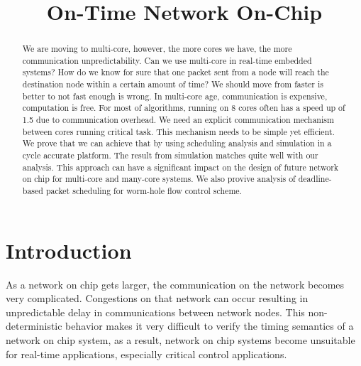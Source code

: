 \documentclass[conference, twocolumn]{IEEEtran}
\theoremstyle{definition}
\begin{document}
\title{On-Time Network On-Chip}


\maketitle

\begin{abstract}
We are moving to multi-core, however, the more cores we have, the more
communication unpredictability. Can we use multi-core in real-time embedded
systems? How do we know for sure that one packet sent from a node will reach
the destination node within a certain amount of time? We should move from
faster is better to not fast enough is wrong. In multi-core age, communication
is expensive, computation is free. For most of algorithms, running on 8 cores
often has a speed up of 1.5 due to communication overhead. We need an explicit
communication mechanism between cores running critical task. This mechanism
needs to be simple yet efficient. We prove that we can achieve that by using
scheduling analysis and simulation in a cycle accurate platform. The result from
simulation matches quite well with our analysis. This approach can have a
significant impact on the design of future network on chip for multi-core and
many-core systems. We also provive analysis of deadline-based packet scheduling
for worm-hole flow control scheme.

\end{abstract}

\section{Introduction}
As a network on chip gets larger, the communication on the network becomes 
very complicated. Congestions on that network can occur resulting in unpredictable 
delay in communications between network nodes. This non-deterministic behavior 
makes it very difficult to verify the timing semantics of a network on chip 
system, as a result, network on chip systems become unsuitable for real-time 
applications, especially critical control applications.
\end{document}
